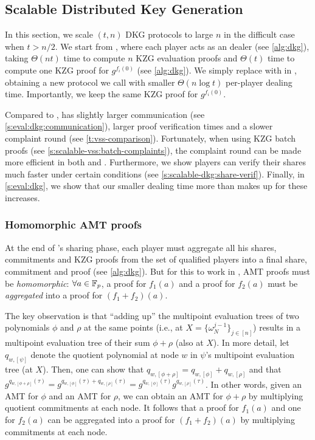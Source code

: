\subsection{Scalable Distributed Key Generation}
\label{s:scalable-dkg}

In this section, we scale $(t,n)$ DKG protocols to large $n$ in the difficult case when $t > n/2$.
We start from \ejfdkg, where each player acts as an \evss dealer (see \cref{alg:dkg}), taking $\Theta(nt)$ time to compute $n$ KZG evaluation proofs and $\Theta(t)$ time to compute one KZG proof for $g^{f_i(0)}$ (see \cref{alg:dkg}).
We simply replace \evss with \ourvss in \ejfdkg, obtaining a new protocol we call \ourdkg with smaller $\Theta(n\log{t})$ per-player dealing time.
Importantly, we keep the same KZG proof for $g^{f_i(0)}$.

Compared to \ejfdkg, \ourdkg has slightly larger communication (see \cref{s:eval:dkg:communication}), larger proof verification times and a slower complaint round (see \cref{t:vss-comparison}).
Fortunately, when using KZG batch proofs (see \cref{s:scalable-vss:batch-complaints}), the complaint round can be made more efficient in both \ejfdkg and \ourdkg.
Furthermore, we show \ourdkg players can verify their shares much faster under certain conditions (see \cref{s:scalable-dkg:share-verif}).
Finally, in \cref{s:eval:dkg}, we show that our smaller dealing time more than makes up for these increases.

\subsubsection{Homomorphic AMT proofs}
\label{s:scalable-dkg:homomorphic-amt}
At the end of \ejfdkg's sharing phase, each player must aggregate all his shares, commitments and KZG proofs from the set of qualified players into a final share, commitment and proof (see \cref{alg:dkg}).
But for this to work in \ourdkg, AMT proofs must be \textit{homomorphic}: $\forall a\in\mathbb{F}_p$, a proof for $f_1(a)$ and a proof for $f_2(a)$ must be \textit{aggregated} into a proof for $(f_1+f_2)(a)$.

The key observation is that ``adding up'' the multipoint evaluation trees of two polynomials $\phi$ and $\rho$ at the same points (i.e., at $X=\{\omega_N^{j-1}\}_{j\in[n]}$) results in a multipoint evaluation tree of their sum $\phi+\rho$ (also at $X$).
In more detail, let $q_{w, [\psi]}$ denote the quotient polynomial at node $w$ in $\psi$'s multipoint evaluation tree (at $X$).
Then, one can show that $q_{w,[\phi+\rho]} = q_{w,[\phi]} + q_{w,[\rho]}$ and that $g^{q_{w,[\phi+\rho]}(\tau)} = g^{q_{w,[\phi]}(\tau) + q_{w,[\rho]}(\tau)} = g^{q_{w,[\phi]}(\tau)} g^{q_{w,[\rho]}(\tau)}$.
In other words, given an AMT for $\phi$ and an AMT for $\rho$, we can obtain an AMT for $\phi+\rho$ by multiplying quotient commitments at each node.
It follows that a proof for $f_1(a)$ and one for $f_2(a)$ can be aggregated into a proof for $(f_1+f_2)(a)$ by multiplying commitments at each node.

